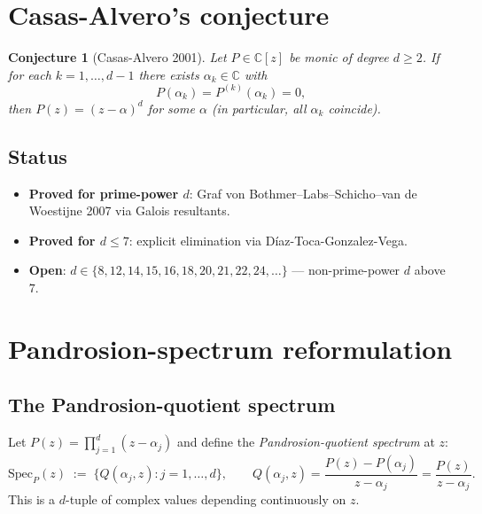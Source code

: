 \documentclass[11pt,a4paper]{article}
\newtheorem{conjecture}[theorem]{Conjecture}
\begin{document}
\tableofcontents

\section{Casas-Alvero's conjecture}\label{sec:setup}

\begin{conjecture}[Casas-Alvero 2001]\label{conj:CA}
Let $P \in \mathbb C[z]$ be monic of degree $d \ge 2$. If for each $k = 1, \dots, d-1$ there exists $\alpha_k \in \mathbb C$ with
\begin{equation}\label{eq:CA-condition}
P(\alpha_k) = P^{(k)}(\alpha_k) = 0,
\end{equation}
then $P(z) = (z - \alpha)^d$ for some $\alpha$ (in particular, all $\alpha_k$ coincide).
\end{conjecture}

\subsection{Status}
\begin{itemize}
\item \textbf{Proved for prime-power $d$}: Graf von Bothmer--Labs--Schicho--van de Woestijne 2007 via Galois resultants.
\item \textbf{Proved for $d \le 7$}: explicit elimination via D{\'i}az-Toca-Gonzalez-Vega.
\item \textbf{Open}: $d \in \{8, 12, 14, 15, 16, 18, 20, 21, 22, 24, \dots\}$ — non-prime-power $d$ above $7$.
\end{itemize}

\section{Pandrosion-spectrum reformulation}\label{sec:reform}

\subsection{The Pandrosion-quotient spectrum}

Let $P(z) = \prod_{j=1}^{d}(z - \alpha_j)$ and define the \emph{Pandrosion-quotient spectrum} at $z$:
\begin{equation}\label{eq:spectrum}
\mathrm{Spec}_P(z) \;:=\; \bigl\{Q(\alpha_j, z) : j = 1, \dots, d\bigr\}, \qquad Q(\alpha_j, z) = \frac{P(z) - P(\alpha_j)}{z - \alpha_j} = \frac{P(z)}{z - \alpha_j}.
\end{equation}
This is a $d$-tuple of complex values depending continuously on $z$.
\end{document}
